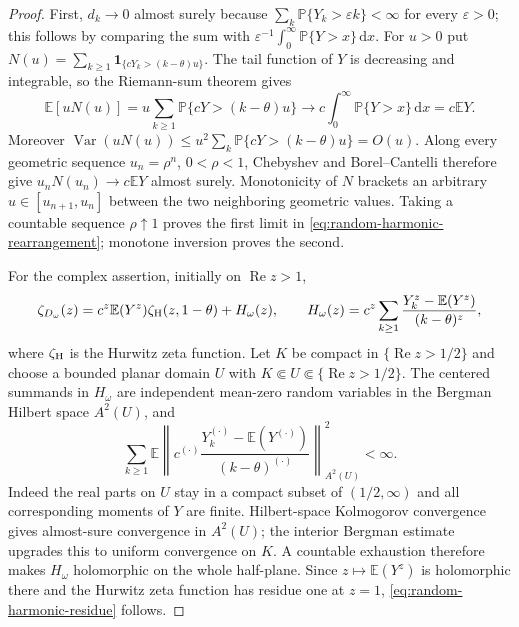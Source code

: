 \documentclass[10pt,reqno]{amsart}
\theoremstyle{plain}
\theoremstyle{definition}
\theoremstyle{remark}
\begin{document}
\begin{proof}
First, $d_k\to0$ almost surely because
$\sum_k\mathbb P\{Y_k>\varepsilon k\}<\infty$ for every $\varepsilon>0$;
this follows by comparing the sum with
$\varepsilon^{-1}\int_0^\infty\mathbb P\{Y>x\}\,\mathrm dx$.
For $u>0$ put $N(u)=\sum_{k\ge1}
\mathbf1_{\{cY_k>(k-\theta)u\}}$.  The tail function of $Y$ is decreasing and
integrable, so the Riemann-sum theorem gives
\[
 \mathbb E[uN(u)]
 =u\sum_{k\ge1}\mathbb P\{cY>(k-\theta)u\}
 \longrightarrow c\int_0^\infty\mathbb P\{Y>x\}\,\mathrm dx
 =c\mathbb EY.
\]
Moreover
$\operatorname{Var}(uN(u))\le u^2\sum_k\mathbb P\{cY>(k-\theta)u\}
=O(u)$.  Along every geometric sequence $u_n=\rho^n$, $0<\rho<1$,
Chebyshev and Borel--Cantelli therefore give
$u_nN(u_n)\to c\mathbb EY$ almost surely.  Monotonicity of $N$ brackets an
arbitrary $u\in[u_{n+1},u_n]$ between the two neighboring geometric values.
Taking a countable sequence $\rho\uparrow1$ proves the first limit in
\eqref{eq:random-harmonic-rearrangement}; monotone inversion proves the
second.

For the complex assertion, initially on $\operatorname{Re}z>1$,
\begin{equation}
 \zeta_{D_\omega}(z)
 =c^z\mathbb E(Y^z)\zeta_{\rm H}(z,1-\theta)+H_\omega(z),
 \qquad
 H_\omega(z)=c^z\sum_{k\ge1}
 \frac{Y_k^z-\mathbb E(Y^z)}{(k-\theta)^z},
 \label{eq:random-harmonic-dirichlet}
\end{equation}
where $\zeta_{\rm H}$ is the Hurwitz zeta function.  Let $K$ be compact in
$\{\operatorname{Re}z>1/2\}$ and choose a bounded planar domain $U$ with
$K\Subset U\Subset\{\operatorname{Re}z>1/2\}$.  The centered summands in
$H_\omega$ are independent mean-zero random variables in the Bergman Hilbert
space $A^2(U)$, and
\[
 \sum_{k\ge1}\mathbb E\left\|
 c^{(\cdot)}\frac{Y_k^{(\cdot)}-\mathbb E(Y^{(\cdot)})}
 {(k-\theta)^{(\cdot)}}\right\|_{A^2(U)}^2<\infty.
\]
Indeed the real parts on $U$ stay in a compact subset of $(1/2,\infty)$ and
all corresponding moments of $Y$ are finite.  Hilbert-space Kolmogorov
convergence gives almost-sure convergence in $A^2(U)$; the interior Bergman
estimate upgrades this to uniform convergence on $K$.  A countable exhaustion
therefore makes $H_\omega$ holomorphic on the whole half-plane.  Since
$z\mapsto\mathbb E(Y^z)$ is holomorphic there and the Hurwitz zeta function
has residue one at $z=1$, \eqref{eq:random-harmonic-residue} follows.
\end{proof}
\end{document}
